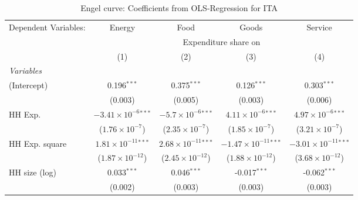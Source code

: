 
\begin{table}[htbp!]
   \centering
   \small
   \begin{adjustbox}{width = 1\textwidth, max height = 0.95\textheight, center}
      \begin{threeparttable}[b]
         \caption{\label{tab:Engel_parametric_ITA} Engel curve: Coefficients from OLS-Regression for ITA}
         \begin{tabular}{lcccc}
            \tabularnewline \midrule \midrule
            Dependent Variables: & Energy                         & Food                           & Goods                           & Service\\  
             & \multicolumn{4}{c}{Expenditure share on} \\ 
                                 & (1)                            & (2)                            & (3)                             & (4)\\  
            \midrule
            \emph{Variables}\\
            (Intercept)          & 0.196$^{***}$                  & 0.375$^{***}$                  & 0.126$^{***}$                   & 0.303$^{***}$\\   
                                 & (0.003)                        & (0.005)                        & (0.003)                         & (0.006)\\   
            HH Exp.              & $-3.41\times 10^{-6}$$^{***}$  & $-5.7\times 10^{-6}$$^{***}$   & $4.11\times 10^{-6}$$^{***}$    & $4.97\times 10^{-6}$$^{***}$\\    
                                 & ($1.76\times 10^{-7}$)         & ($2.35\times 10^{-7}$)         & ($1.85\times 10^{-7}$)          & ($3.21\times 10^{-7}$)\\    
            HH Exp. square       & $1.81\times 10^{-11}$$^{***}$  & $2.68\times 10^{-11}$$^{***}$  & $-1.47\times 10^{-11}$$^{***}$  & $-3.01\times 10^{-11}$$^{***}$\\    
                                 & ($1.87\times 10^{-12}$)        & ($2.45\times 10^{-12}$)        & ($1.88\times 10^{-12}$)         & ($3.68\times 10^{-12}$)\\    
            HH size (log)        & 0.033$^{***}$                  & 0.046$^{***}$                  & -0.017$^{***}$                  & -0.062$^{***}$\\   
                                 & (0.002)                        & (0.003)                        & (0.003)                         & (0.003)\\   

\end{tabular}
\end{threeparttable}
\end{adjustbox}
\end{table}
